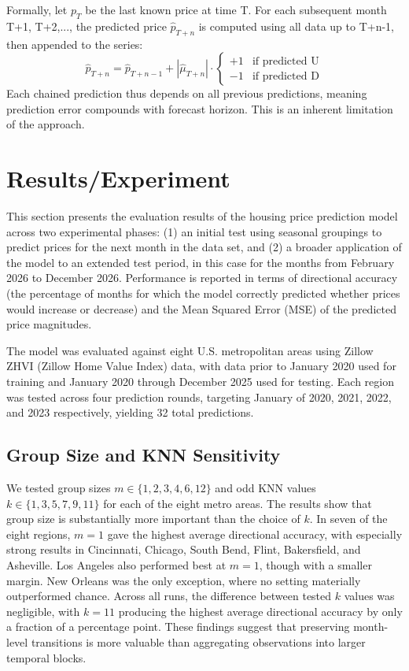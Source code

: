 \documentclass{article}
\begin{document}
Formally, let $p_{T}$ be the last known price at time T.  For each subsequent month T+1, T+2,..., the predicted price $\hat{p}_{T+n}$ is computed using all data up to T+n-1, then appended to the series: 
\[
\hat{p}_{T+n} = \hat{p}_{T+n-1} + |\hat{\mu}_{T+n}| \cdot 
\begin{cases} 
+1 & \text{if predicted U} \\ 
-1 & \text{if predicted D} 
\end{cases}
\] Each chained prediction thus depends on all previous predictions, meaning prediction error compounds with forecast horizon. This is an inherent limitation of the approach. 

\section{Results/Experiment}
This section presents the evaluation results of the housing price prediction model across two experimental phases: (1) an initial test using seasonal groupings to predict prices for the next month in the data set, and (2) a broader application of the model to an extended test period, in this case for the months from February 2026 to December 2026. Performance is reported in terms of directional accuracy (the percentage of months for which the model correctly predicted whether prices would increase or decrease) and the Mean Squared Error (MSE) of the predicted price magnitudes.  

The model was evaluated against eight U.S. metropolitan areas using Zillow ZHVI (Zillow Home Value Index) data, with data prior to January 2020 used for training and January 2020 through December 2025 used for testing. Each region was tested across four prediction rounds, targeting  January of 2020, 2021, 2022, and 2023 respectively, yielding 32 total predictions. 

\subsection{Group Size and KNN Sensitivity}
We tested group sizes $m \in \{1,2,3,4,6,12\}$ and odd KNN values $k \in \{1,3,5,7,9,11\}$ for each of the eight metro areas. The results show that group size is substantially more important than the choice of $k$. In seven of the eight regions, $m=1$ gave the highest average directional accuracy, with especially strong results in Cincinnati, Chicago, South Bend, Flint, Bakersfield, and Asheville. Los Angeles also performed best at $m=1$, though with a smaller margin. New Orleans was the only exception, where no setting materially outperformed chance. Across all runs, the difference between tested $k$ values was negligible, with $k=11$ producing the highest average directional accuracy by only a fraction of a percentage point. These findings suggest that preserving month-level transitions is more valuable than aggregating observations into larger temporal blocks.
\end{document}
